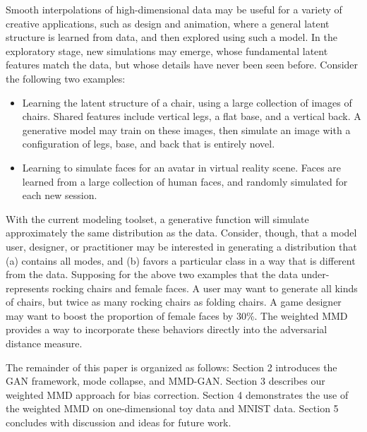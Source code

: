 Smooth interpolations of high-dimensional data may be useful for a variety of creative applications, such as design and animation, where a general latent structure is learned from data, and then explored using such a model. In the exploratory stage, new simulations may emerge, whose fundamental latent features match the data, but whose details have never been seen before. Consider the following two examples: 
\begin{itemize}
\item Learning the latent structure of a chair, using a large collection of images of chairs. Shared features include vertical legs, a flat base, and a vertical back. A generative model may train on these images, then simulate an image with a configuration of legs, base, and back that is entirely novel.\\
\item Learning to simulate faces for an avatar in virtual reality scene. Faces are learned from a large collection of human faces, and randomly simulated for each new session.
\end{itemize}
With the current modeling toolset, a generative function will simulate approximately the same distribution as the data. Consider, though, that a model user, designer, or practitioner may be interested in generating a distribution that (a) contains all modes, and (b) favors a particular class in a way that is different from the data. Supposing for the above two examples that the data under-represents rocking chairs and female faces. A user may want to generate all kinds of chairs, but twice as many rocking chairs as folding chairs. A game designer may want to boost the proportion of female faces by 30\%. The weighted MMD provides a way to incorporate these behaviors directly into the adversarial distance measure. 

The remainder of this paper is organized as follows: Section 2 introduces the GAN framework, mode collapse, and MMD-GAN. Section 3 describes our weighted MMD approach for bias correction. Section 4 demonstrates the use of the weighted MMD on one-dimensional toy data and MNIST data. Section 5 concludes with discussion and ideas for future work. 
